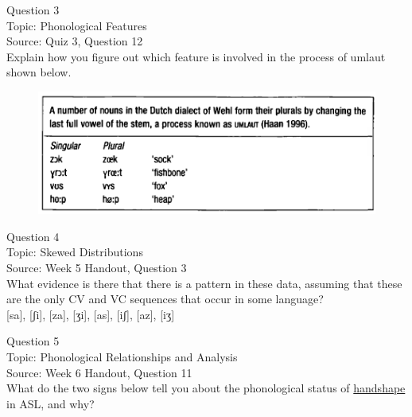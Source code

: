 \documentclass[12pt]{article}
\begin{document}
\newpage

{\large Question 3}\\

Topic: Phonological Features\\
Source: Quiz 3, Question 12\\

Explain how you figure out which feature is involved in the process of umlaut shown below.\\

\begin{figure}[H]
\includegraphics{../images/dutch.png}
\end{figure}

\newpage

{\large Question 4}\\

Topic: Skewed Distributions\\
Source: Week 5 Handout, Question 3\\

What evidence is there that there is a pattern in these data, assuming that these are the only CV and VC sequences that occur in some language?\\

{[sa]}, {[ʃi]}, {[za]}, {[ʒi]}, {[as]}, {[iʃ]}, {[az]}, {[iʒ]}


\newpage

{\large Question 5}\\

Topic: Phonological Relationships and Analysis\\
Source: Week 6 Handout, Question 11\\

What do the two signs below tell you about the phonological status of \underline{handshape} in ASL, and why?\\
\end{document}
